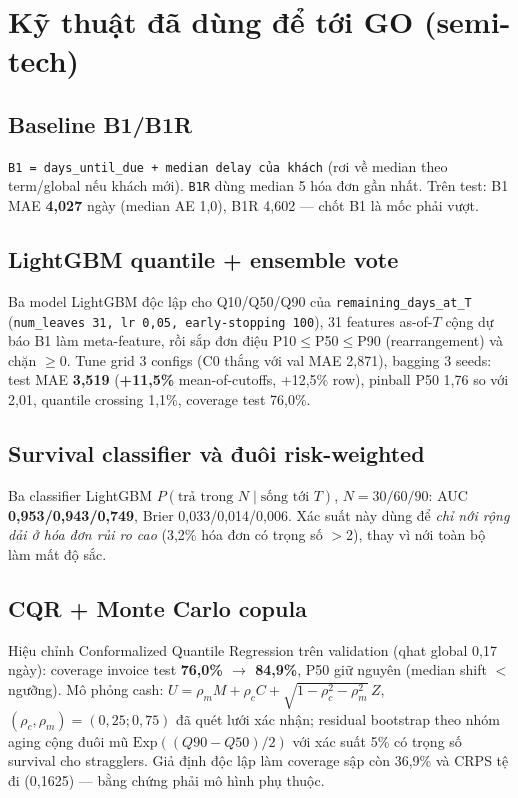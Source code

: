 \documentclass[12pt,a4paper]{article}
\begin{document}
\section{Kỹ thuật đã dùng để tới GO (semi-tech)}
\label{sec:tech}

\subsection{Baseline B1/B1R}
\texttt{B1 = days\_until\_due + median delay của khách} (rơi về median theo term/global nếu
khách mới). \texttt{B1R} dùng median 5 hóa đơn gần nhất. Trên test:
B1 MAE \textbf{4,027} ngày (median AE 1,0), B1R 4,602 --- chốt B1 là mốc phải vượt.

\subsection{LightGBM quantile + ensemble vote}
Ba model LightGBM độc lập cho Q10/Q50/Q90 của \texttt{remaining\_days\_at\_T}
(\texttt{num\_leaves 31, lr 0,05, early-stopping 100}), 31 features as-of-$T$ cộng
dự báo B1 làm meta-feature, rồi sắp đơn điệu P10$\le$P50$\le$P90 (rearrangement) và chặn $\ge$0.
Tune grid 3 configs (C0 thắng với val MAE 2,871), bagging 3 seeds:
test MAE \textbf{3,519} (\textbf{+11,5\%} mean-of-cutoffs, +12,5\% row), pinball P50 1,76 so với 2,01,
quantile crossing 1,1\%, coverage test 76,0\%.

\subsection{Survival classifier và đuôi risk-weighted}
Ba classifier LightGBM $P(\text{trả trong }N\mid \text{sống tới }T)$, $N=30/60/90$:
AUC \textbf{0,953/0,943/0,749}, Brier 0,033/0,014/0,006. Xác suất này dùng để
\textit{chỉ nới rộng dải ở hóa đơn rủi ro cao} (3,2\% hóa đơn có trọng số $>$2),
thay vì nới toàn bộ làm mất độ sắc.

\subsection{CQR + Monte Carlo copula}
Hiệu chỉnh Conformalized Quantile Regression trên validation (qhat global 0,17 ngày):
coverage invoice test \textbf{76,0\% $\to$ 84,9\%}, P50 giữ nguyên (median shift $<$ ngưỡng).
Mô phỏng cash: $U=\rho_m M+\rho_c C+\sqrt{1-\rho_c^2-\rho_m^2}\,Z$,
$(\rho_c,\rho_m)=(0{,}25;0{,}75)$ đã quét lưới xác nhận; residual bootstrap theo nhóm aging
cộng đuôi mũ $\mathrm{Exp}((Q90-Q50)/2)$ với xác suất 5\% có trọng số survival cho stragglers.
Giả định độc lập làm coverage sập còn 36,9\% và CRPS tệ đi (0,1625) --- bằng chứng phải mô hình
phụ thuộc.
\end{document}
